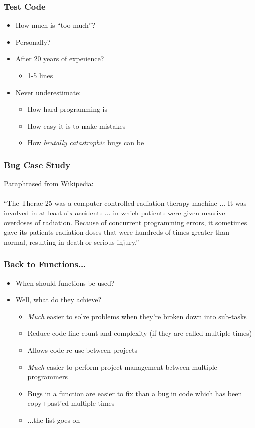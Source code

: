 \documentclass[14pt]{beamer}
\begin{document}
\begin{frame}
\frametitle{Test Code}
\begin{itemize}
\item How much is ``too much''?
\pause
\item Personally?
\pause
\item After 20 years of experience?
\pause
	\begin{itemize}
		\item 1-5 lines
	\end{itemize}
\pause
\item Never underestimate:
	\begin{itemize}
		\item How hard programming is
		\item How easy it is to make mistakes
		\item How \textit{brutally catastrophic} bugs can be
	\end{itemize}
\pause
\end{itemize}
\end{frame}

\begin{frame}
\frametitle{Bug Case Study}
Paraphrased from \underline{\href{https://en.wikipedia.org/wiki/Therac-25}{Wikipedia}}:
\\~\\
``The Therac-25 was a computer-controlled radiation therapy machine ... It was involved in at least six accidents ...  in which patients were given massive overdoses of radiation. Because of concurrent programming errors, it sometimes gave its patients radiation doses that were hundreds of times greater than normal, resulting in death or serious injury.''
\end{frame}

\begin{frame}
\frametitle{Back to Functions...}
\begin{itemize}
\item When should functions be used?
\pause
\item Well, what do they achieve?
	\begin{itemize}
		\item \textit{Much} easier to solve problems when they're broken down into sub-tasks
		\item Reduce code line count and complexity (if they are called multiple times)
		\item Allows code re-use between projects
		\item \textit{Much} easier to perform project management between multiple programmers
		\item Bugs in a function are easier to fix than a bug in code which has been copy+past'ed multiple times
		\item ...the list goes on
	\end{itemize}
\end{itemize}
\end{frame}
\end{document}
